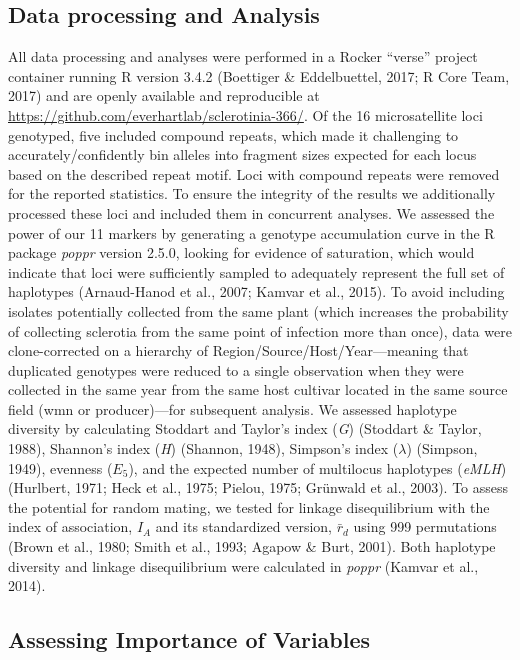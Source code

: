 \documentclass[fleqn,10pt,lineno]{wlpeerj} %
\theoremstyle{definition}
\theoremstyle{definition}
\theoremstyle{definition}
\theoremstyle{remark}
\begin{document}
\subsection*{Data processing and
Analysis}\label{data-processing-and-analysis}

All data processing and analyses were performed in a Rocker ``verse''
project container running R version 3.4.2 (Boettiger \& Eddelbuettel,
2017; R Core Team, 2017) and are openly available and reproducible at
\url{https://github.com/everhartlab/sclerotinia-366/}. Of the 16
microsatellite loci genotyped, five included compound repeats, which
made it challenging to accurately/confidently bin alleles into fragment
sizes expected for each locus based on the described repeat motif. Loci
with compound repeats were removed for the reported statistics. To
ensure the integrity of the results we additionally processed these loci
and included them in concurrent analyses. We assessed the power of our
11 markers by generating a genotype accumulation curve in the R package
\emph{poppr} version 2.5.0, looking for evidence of saturation, which
would indicate that loci were sufficiently sampled to adequately
represent the full set of haplotypes (Arnaud-Hanod et al., 2007; Kamvar
et al., 2015). To avoid including isolates potentially collected from
the same plant (which increases the probability of collecting sclerotia
from the same point of infection more than once), data were
clone-corrected on a hierarchy of Region/Source/Host/Year---meaning that
duplicated genotypes were reduced to a single observation when they were
collected in the same year from the same host cultivar located in the
same source field (wmn or producer)---for subsequent analysis. We
assessed haplotype diversity by calculating Stoddart and Taylor's index
(\emph{G}) (Stoddart \& Taylor, 1988), Shannon's index (\emph{H})
(Shannon, 1948), Simpson's index (\(\lambda\)) (Simpson, 1949), evenness
(\(E_5\)), and the expected number of multilocus haplotypes
(\emph{eMLH}) (Hurlbert, 1971; Heck et al., 1975; Pielou, 1975; Grünwald
et al., 2003). To assess the potential for random mating, we tested for
linkage disequilibrium with the index of association, \(I_A\) and its
standardized version, \(\bar{r}_d\) using 999 permutations (Brown et
al., 1980; Smith et al., 1993; Agapow \& Burt, 2001). Both haplotype
diversity and linkage disequilibrium were calculated in \emph{poppr}
(Kamvar et al., 2014).

\subsection*{Assessing Importance of
Variables}\label{assessing-importance-of-variables}
\end{document}
